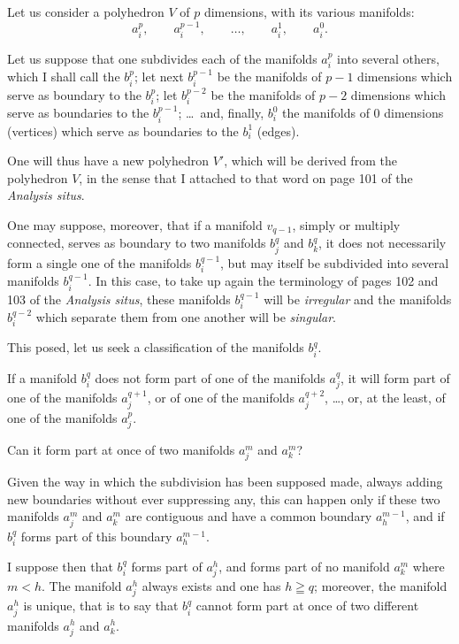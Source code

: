 \documentclass{article}
\begin{document}
Let us consider a polyhedron $V$ of $p$ dimensions, with its various manifolds:
\[ a^{p}_{i}, \qquad a^{p-1}_{i}, \qquad \ldots, \qquad a^{1}_{i}, \qquad a^{0}_{i}. \]

Let us suppose that one subdivides each of the manifolds $a^{p}_{i}$ into several others, which I shall call the $b^{p}_{i}$; let next $b^{p-1}_{i}$ be the manifolds of $p - 1$ dimensions which serve as boundary to the $b^{p}_{i}$; let $b^{p-2}_{i}$ be the manifolds of $p - 2$ dimensions which serve as boundaries to the $b^{p-1}_{i}$; \ldots\ and, finally, $b^{0}_{i}$ the manifolds of 0 dimensions (vertices) which serve as boundaries to the $b^{1}_{i}$ (edges).

One will thus have a new polyhedron $V'$, which will be derived from the polyhedron $V$, in the sense that I attached to that word on page 101 of the \emph{Analysis situs}.

One may suppose, moreover, that if a manifold $v_{q-1}$, simply or multiply connected, serves as boundary to two manifolds $b^{q}_{j}$ and $b^{q}_{k}$, it does not necessarily form a single one of the manifolds $b^{q-1}_{i}$, but may itself be subdivided into several manifolds $b^{q-1}_{i}$. In this case, to take up again the terminology of pages 102 and 103 of the \emph{Analysis situs}, these manifolds $b^{q-1}_{i}$ will be \emph{irregular} and the manifolds $b^{q-2}_{i}$ which separate them from one another will be \emph{singular}.


This posed, let us seek a classification of the manifolds $b^{q}_{i}$.

If a manifold $b^{q}_{i}$ does not form part of one of the manifolds $a^{q}_{j}$, it will form part of one of the manifolds $a^{q+1}_{j}$, or of one of the manifolds $a^{q+2}_{j}$, \ldots, or, at the least, of one of the manifolds $a^{p}_{j}$.

Can it form part at once of two manifolds $a^{m}_{j}$ and $a^{m}_{k}$?

Given the way in which the subdivision has been supposed made, always adding new boundaries without ever suppressing any, this can happen only if these two manifolds $a^{m}_{j}$ and $a^{m}_{k}$ are contiguous and have a common boundary $a^{m-1}_{h}$, and if $b^{q}_{i}$ forms part of this boundary $a^{m-1}_{h}$.

I suppose then that $b^{q}_{i}$ forms part of $a^{h}_{j}$, and forms part of no manifold $a^{m}_{k}$ where $m < h$. The manifold $a^{h}_{j}$ always exists and one has $h \geqq q$; moreover, the manifold $a^{h}_{j}$ is unique, that is to say that $b^{q}_{i}$ cannot form part at once of two different manifolds $a^{h}_{j}$ and $a^{h}_{k}$.
\end{document}
